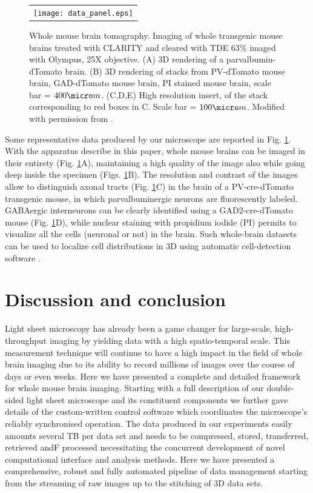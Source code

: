 \documentclass[12pt]{spieman}  %
\begin{document}
	\begin{figure}
   \begin{center}
   \begin{tabular}{c}
   \texttt{[image: data\_panel.eps]}
   \end{tabular}
   \end{center}
   \caption{\label{fig:LSMdata} Whole mouse brain tomography. Imaging of whole transgenic mouse brains treated with CLARITY and cleared with TDE 63\% imaged with Olympus, 25X objective. (A) 3D rendering of a parvalbumin-dTomato brain. (B) 3D rendering of stacks from PV-dTomato mouse brain, GAD-dTomato mouse brain,  PI stained mouse brain, scale bar = $400 \micro m$. (C,D,E) High resolution insert, of the stack corresponding to red boxes in C. Scale bar = $100 \micro m$. Modified with permission from \cite{Costantini}.} 
   \end{figure}
	
Some representative data produced by our microscope are reported in Fig. \ref{fig:LSMdata}. With the apparatus describe in this paper, whole mouse brains can be imaged in their entirety (Fig. \ref{fig:LSMdata}A), maintaining a high quality of the image also while going deep inside the specimen (Figs. \ref{fig:LSMdata}B). The resolution and contrast of the images allow to distinguish axonal tracts (Fig. \ref{fig:LSMdata}C) in the brain of a PV-cre-dTomato transgenic mouse, in which parvalbuminergic neurons are fluorescently labeled. GABAergic interneurons can be clearly identified using a GAD2-cre-dTomato mouse (Fig. \ref{fig:LSMdata}D), while nuclear staining with propidium iodide (PI) permits to visualize all the cells (neuronal or not) in the brain. Such whole-brain datasets can be used to localize cell distributions in 3D using automatic cell-detection software \cite{Frasconi2014}.

\section{Discussion and conclusion}

Light sheet microscopy has already been a game changer for large-scale, high-throughput imaging by yielding data with a high spatio-temporal scale. This measurement technique will continue to have a high impact in the field of whole brain imaging due to its ability to record millions of images over the course of days or even weeks. Here we have presented a complete and detailed framework for whole mouse brain imaging. Starting with a full description of our double-sided light sheet microscope and its constituent components we further gave details of the custom-written control software which coordinates the microscope's reliably synchronised operation. The data produced in our experiments easily amounts several TB per data set and needs to be compressed, stored, transferred, retrieved andF processed necessitating the concurrent development of novel computational interface and analysis methods. Here we have presented a comprehensive, robust and fully automated pipeline of data management starting from the streaming of raw images up to the stitching of 3D data sets.
\end{document}
